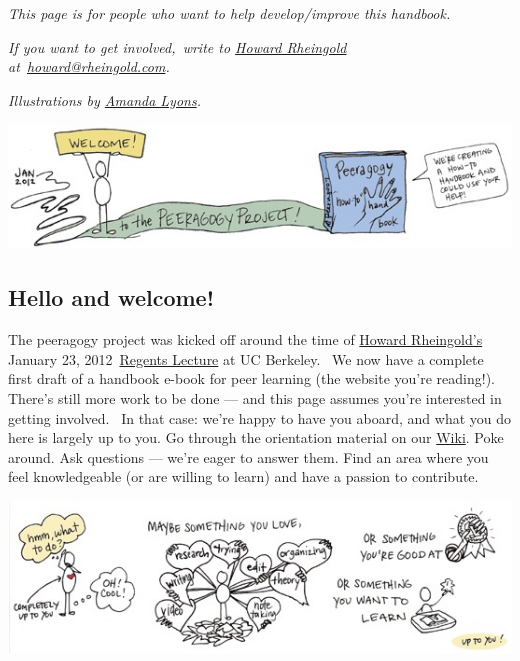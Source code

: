 \emph{This page is for people who want to help develop/improve this
handbook.}

\emph{If you want to get involved,~write to
\href{http://en.wikipedia.org/wiki/Howard\_Rheingold}{Howard Rheingold}
at~\href{mailto:howard@rheingold.com}{howard@rheingold.com}.}

\emph{Illustrations by \href{http://www.visualsforchange.com/}{Amanda
Lyons}.}

\begin{center}
\href{http://peeragogy.org/wp-content/uploads/2012/03/welcome\_color.gif}{\includegraphics[width=.9\textwidth]{./pictures/welcome_color.jpg}}
\end{center}

\subsection{Hello and welcome!}

The peeragogy project was kicked off around the time of
\href{http://rheingold.com/}{Howard Rheingold's} January 23,
2012~\href{http://vimeo.com/35685124}{Regents Lecture} at UC Berkeley.~
We now have a complete first draft of a handbook e-book for peer
learning (the website you're reading!). There's still more work to be
done --- and this page assumes you're interested in getting involved.~
In that case: we're happy to have you aboard, and what you do here is
largely up to you. Go through the orientation material on our
\href{http://socialmediaclassroom.com/host/peeragogy}{Wiki}. Poke
around. Ask questions --- we're eager to answer them. Find an area where
you feel knowledgeable (or are willing to learn) and have a passion to
contribute.

\begin{center}
\href{http://peeragogy.org/wp-content/uploads/2012/03/what\_to\_do\_color.gif}{\includegraphics[width=.9\textwidth]{./pictures/what_to_do_color.jpg}}
\end{center}

